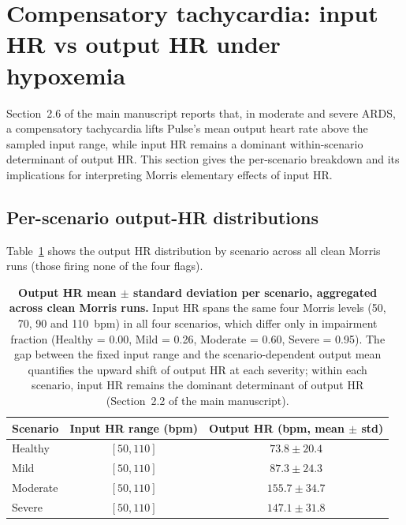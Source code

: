 \documentclass[pdflatex,sn-nature]{sn-jnl}%
\newcommand{\mainref}[2]{#2}
\begin{document}

\section{Compensatory tachycardia: input HR vs output HR under hypoxemia}\label{sec:s15}

Section~\mainref{sec:results-secondary}{2.6} of the main manuscript reports that, in moderate and severe ARDS, a compensatory tachycardia lifts Pulse's mean output heart rate above the sampled input range, while input HR remains a dominant within-scenario determinant of output HR. This section gives the per-scenario breakdown and its implications for interpreting Morris elementary effects of input HR.

\subsection{Per-scenario output-HR distributions}\label{sec:s15-distributions}

Table~\ref{tab:s15-comphr} shows the output HR distribution by scenario across all clean Morris runs (those firing none of the four flags).

\begin{table}[htbp]
\centering
\caption{\textbf{Output HR mean $\pm$ standard deviation per scenario, aggregated across clean Morris runs.} Input HR spans the same four Morris levels (50, 70, 90 and 110~bpm) in all four scenarios, which differ only in impairment fraction (Healthy = 0.00, Mild = 0.26, Moderate = 0.60, Severe = 0.95). The gap between the fixed input range and the scenario-dependent output mean quantifies the upward shift of output HR at each severity; within each scenario, input HR remains the dominant determinant of output HR (Section~\mainref{sec:results-morris}{2.2} of the main manuscript).}
\label{tab:s15-comphr}
\begin{tabular}{lcc}
\toprule
Scenario & Input HR range (bpm) & Output HR (bpm, mean $\pm$ std) \\
\midrule
Healthy         & $[50, 110]$ & $73.8 \pm 20.4$ \\
Mild       & $[50, 110]$ & $87.3 \pm 24.3$ \\
Moderate   & $[50, 110]$ & $155.7 \pm 34.7$ \\
Severe     & $[50, 110]$ & $147.1 \pm 31.8$ \\
\bottomrule
\end{tabular}
\end{table}
\end{document}
